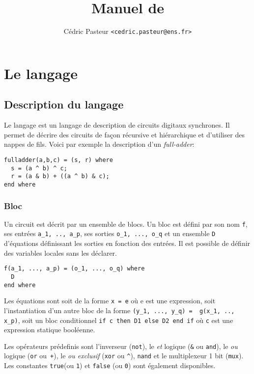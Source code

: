 \documentclass[a4paper]{article}
\title{Manuel de \minijazz{}}
\author{Cédric Pasteur \texttt{<cedric.pasteur@ens.fr>}}
\begin{document}
\maketitle

\section{Le langage \minijazz}

\subsection{Description du langage}

Le langage \minijazz{} est un langage de description de circuits digitaux synchrones. Il permet de décrire des circuits de façon récursive et hiérarchique et d'utiliser des nappes de fils. Voici par exemple la description d'un \emph{full-adder}:
\begin{lstlisting}
fulladder(a,b,c) = (s, r) where
  s = (a ^ b) ^ c;
  r = (a & b) + ((a ^ b) & c);
end where
\end{lstlisting}

\subsubsection*{Bloc}

Un circuit est décrit par un ensemble de blocs. Un bloc est défini par son nom \texttt{f}, ses entrées \lstinline{a_1, .., a_p}, ses sorties \lstinline{o_1, ..., o_q} et un ensemble \texttt{D} d'équations définissant les sorties en fonction des entrées. Il est possible de définir des variables locales sans les déclarer.
\begin{lstlisting}
f(a_1, ..., a_p) = (o_1, ..., o_q) where
  D
end where
\end{lstlisting}

Les équations sont soit de la forme \lstinline+x = e+ où e est une expression, soit l'instantiation d'un autre bloc de la forme \lstinline+(y_1, ..., y_q) =  g(x_1, .., x_p)+, soit un bloc conditionnel \lstinline+if c then D1 else D2 end if+ où \lstinline+c+ est une expression statique booléenne.

Les opérateurs prédefinis sont l'inverseur (\lstinline+not+), le \emph{et} logique (\lstinline+&+ ou \lstinline+and+), le \emph{ou} logique (\lstinline+or+ ou~\lstinline{+}), le \emph{ou exclusif} (\lstinline+xor+ ou \lstinline+^+), \lstinline+nand+ et le multiplexeur 1 bit (\lstinline+mux+). Les constantes \lstinline+true+(ou \texttt{1}) et \lstinline+false+ (ou \texttt{0}) sont également disponibles.
\end{document}
